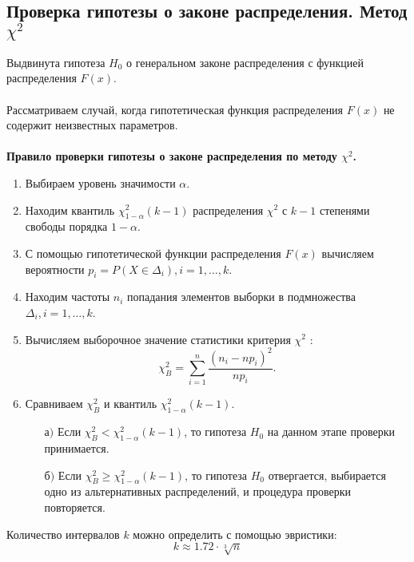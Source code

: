 \documentclass[12pt]{article}
\begin{document}
\begin{flushleft}
	\subsection{Проверка гипотезы о законе распределения. Метод $\chi^2$}
	Выдвинута гипотеза $H_0$ о генеральном законе распределения с функцией
	распределения $F(x)$.\\
	\phantom{0}\\
	Рассматриваем случай, когда гипотетическая функция распределения $F(x)$
	не содержит неизвестных параметров.\\
	\phantom{0}\\
	\textbf{Правило проверки гипотезы о законе распределения по методу $\chi^2$.}\cite{theory}
	\begin{enumerate}
		\item Выбираем уровень значимости $\alpha$.

		\item Находим квантиль $\chi^2_{1-\alpha}(k-1)$ распределения $\chi^2$ с $k-1$ степенями свободы порядка $1-\alpha$.

		\item С помощью гипотетической функции распределения $F(x)$ вычисляем
		вероятности $p_i = P(X\in \Delta_i), i=1,\dots,k$.

		\item Находим частоты $n_i$ попадания элементов выборки в подмножества
		$\Delta_i, i = 1,\dots,k$.

		\item Вычисляем выборочное значение статистики критерия $\chi^2$ :
		\[
			\chi^2_B = \sum_{i=1}^{n}\frac{(n_i - np_i)^2}{np_i}.    
		\]

		\item Сравниваем $\chi^2_B$ и квантиль  $\chi^2_{1-\alpha}(k-1)$.
		\begin{itemize}
			\item[$\text{а)}$] Если $\chi^2_B < \chi^2_{1-\alpha}(k-1)$, то гипотеза $H_0$ на данном этапе проверки принимается.
			\item[$\text{б)}$] Если $\chi^2_B \geq \chi^2_{1-\alpha}(k-1)$, то гипотеза $H_0$ отвергается, выбирается одно из альтернативных распределений, и процедура проверки повторяется.
		\end{itemize}
	\end{enumerate}
	Количество интервалов $k$ можно определить с помощью эвристики:
	\begin{equation}
		k \approx 1.72\cdot\sqrt[3]{n}
		\label{k}
	\end{equation}


\end{flushleft}
\end{document}
